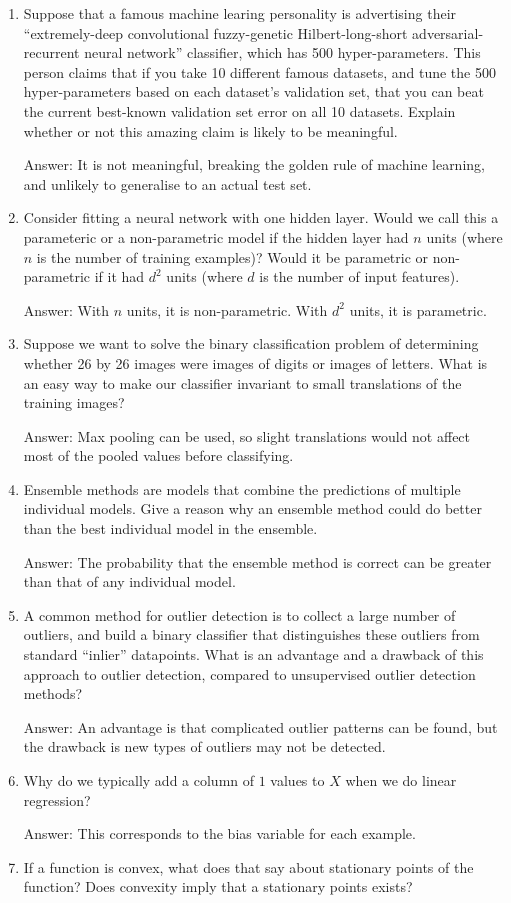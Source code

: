 \documentclass{article}
\def\ans#1{\par\gre{Answer: #1}}
\def\blu#1{{\color{blu}#1}}
\def\gre#1{{\color{gre}#1}}
\def\enum#1{\begin{enumerate}#1\end{enumerate}}
\begin{document}
\blu{
\enum{
\item Suppose that a famous machine learing personality is advertising their  ``extremely-deep convolutional fuzzy-genetic Hilbert-long-short adversarial-recurrent neural network'' classifier, which has 500 hyper-parameters. This person claims that if you take 10 different famous datasets, and tune the 500 hyper-parameters based on each dataset's validation set, that you can beat the current best-known validation set error on all 10 datasets. Explain whether or not this amazing claim is likely to be meaningful.
\ans{
It is not meaningful, breaking the golden rule of machine learning, and unlikely to generalise to an actual test set.
}
\item Consider fitting a neural network with one hidden layer. Would we call this a parameteric or a non-parametric model if the hidden layer had $n$ units (where $n$ is the number of training examples)? Would it be parametric or non-parametric if it had $d^2$ units (where $d$ is the number of input features).
\ans{
With $n$ units, it is non-parametric.
With $d^2$ units, it is parametric.
}
\item  Suppose we want to solve the binary classification problem of determining whether 26 by 26 images were images of digits or images of letters. What is an easy way to make our classifier invariant to small translations of the training images?
\ans{
Max pooling can be used, so slight translations would not affect most of the pooled values before classifying.
}
\item Ensemble methods are models that combine the predictions of multiple individual models. Give a reason why an ensemble method could do better than the best individual model in the ensemble.
\ans{
The probability that the ensemble method is correct can be greater than that of any individual model.
}
\item A common method for outlier detection is to collect a large number of outliers, and build a binary classifier that distinguishes these outliers from standard ``inlier'' datapoints. What is an advantage and a drawback of this approach to outlier detection, compared to unsupervised outlier detection methods?
\ans{
An advantage is that complicated outlier patterns can be found,
but the drawback is new types of outliers may not be detected.
}
\pagebreak
\item Why do we typically add a column of $1$ values to $X$ when we do linear regression?
\ans{
This corresponds to the bias variable for each example.
}
\item If a function is convex, what does that say about stationary points of the function? Does convexity imply that a stationary points exists?
}}
\end{document}
